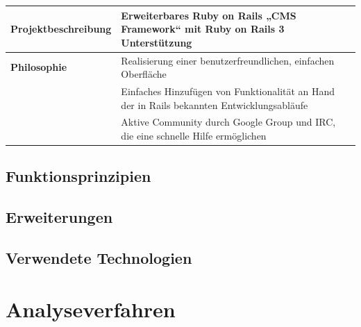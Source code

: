 \begin{table}
\begin{tabular}[!ht]{|l|l|l|}
\hline
\textbf{Projektbeschreibung} & \multicolumn{2}{p{10cm}|}{Erweiterbares Ruby on Rails „CMS Framework“ mit  Ruby on Rails 3 Unterstützung} \\
\hline
\textbf{Philosophie} & \multicolumn{2}{p{10cm}|}{Realisierung einer benutzerfreundlichen, einfachen Oberfläche} \\
& \multicolumn{2}{p{10cm}|}{Einfaches Hinzufügen von Funktionalität an Hand der in Rails bekannten Entwicklungsabläufe}\\
& \multicolumn{2}{p{10cm}|}{Aktive Community durch Google Group und IRC, die eine schnelle Hilfe ermöglichen}\\
\hline
\end{tabular}
\end{table}
\subsection{Funktionsprinzipien}
\subsection{Erweiterungen}
\subsection{Verwendete Technologien}

\newpage
\center
\section{Analyseverfahren}
